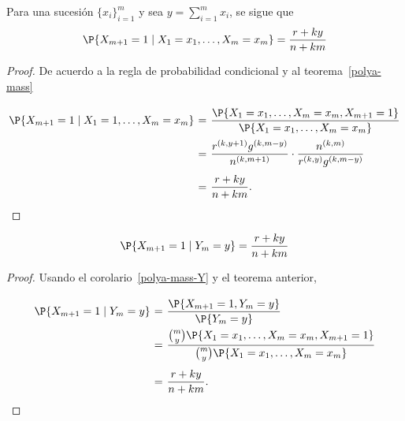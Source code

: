 \begin{theorem}
    Para una sucesión $\{x_i\}_{i = 1}^m$ y sea $y = \sum_{i = 1}^m x_i$, se sigue que
    \[ \P\{X_{m+1} = 1 \;|\; X_1 = x_1, \ldots, X_m = x_m\} = \frac{r+ky}{n+km} \]
\end{theorem}
\begin{proof} De acuerdo a la regla de probabilidad condicional y al teorema~\ref{polya-mass}
    \[ \everymath{\displaystyle}
    \arraycolsep=1.8pt\def\arraystretch{2.5}
    \begin{array}{rcl}
        \P\{X_{m+1} = 1 \;|\; X_1 = 1, \ldots, X_m = x_m\} & = & \frac{\P\{X_1 = x_1, \ldots, X_m = x_m, X_{m+1} = 1\}}{\P\{X_1 = x_1, \ldots, X_m = x_m\}}\\
        & = & \frac{r^{(k,y+1)} g^{(k,m-y)}}{n^{(k,m+1)}} \cdot \frac{n^{(k,m)}}{r^{(k,y)} g^{(k,m-y)}}\\
        & = & \frac{r+ky}{n+km}.
    \end{array} \]
\end{proof}

\begin{corollary}
    \[ \P\{X_{m+1} = 1 \;|\; Y_m = y\} = \frac{r+ky}{n+km} \]
\end{corollary}
\begin{proof}
    Usando el corolario~\ref{polya-mass-Y} y el teorema anterior,
    \[ \everymath{\displaystyle}
    \arraycolsep=1.8pt\def\arraystretch{2.5}
    \begin{array}{rcl}
        \P\{X_{m+1} = 1 \;|\; Y_m = y\} & = & \frac{\P\{X_{m+1} = 1, Y_m = y\}}{\P\{Y_m = y\}}\\
        & = & \frac{\binom{m}{y} \P\{X_1 = x_1, \ldots, X_m = x_m, X_{m+1} = 1\}}{\binom{m}{y} \P\{X_1 = x_1, \ldots, X_m = x_m\} }\\
        & = & \frac{r+ky}{n+km}.
    \end{array} \]
\end{proof}

